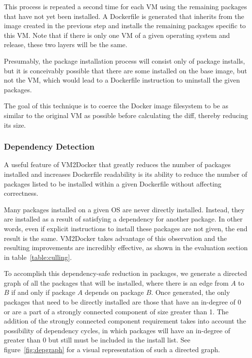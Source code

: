 This process is repeated a second time for each VM using the remaining packages that have not yet been installed. A Dockerfile is generated that inherits from the image created in the previous step and installs the remaining packages specific to this VM. Note that if there is only one VM of a given operating system and release, these two layers will be the same.

Presumably, the package installation process will consist only of package installs, but it is conceivably possible that there are some installed on the base image, but not the VM, which would lead to a Dockerfile instruction to uninstall the given packages.

The goal of this technique is to coerce the Docker image filesystem to be as similar to the original VM as possible before calculating the diff, thereby reducing its size.

\subsubsection{Dependency Detection}
\label{sec:depdetection}
A useful feature of VM2Docker that greatly reduces the number of packages installed and increases Dockerfile readability is its ability to reduce the number of packages listed to be installed within a given Dockerfile without affecting correctness.

Many packages installed on a given OS are never directly installed. Instead, they are installed as a result of satisfying a dependency for another package. In other words, even if explicit instructions to install these packages are not given, the end result is the same. VM2Docker takes advantage of this observation and the resulting improvements are incredibly effective, as shown in the evaluation section in table~\ref{table:culling}.

To accomplish this dependency-safe reduction in packages, we generate a directed graph of all the packages that will be installed, where there is an edge from $A$ to $B$ if and only if package $A$ depends on package $B$. Once generated, the only packages that need to be directly installed are those that have an in-degree of 0 or are a part of a strongly connected component of size greater than 1. The addition of the strongly connected component requirement takes into account the possibility of dependency cycles, in which packages will have an in-degree of greater than 0 but still must be included in the install list. See figure~\ref{fig:depgraph} for a visual representation of such a directed graph.

